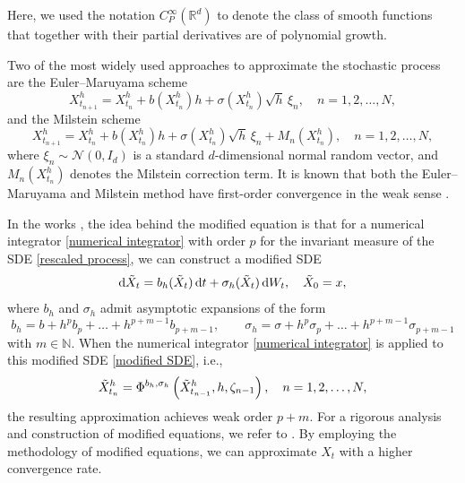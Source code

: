 \documentclass[12pt,a4paper,reqno]{amsart}
\numberwithin{equation}{section}
\begin{document}
Here, we used the notation $C_P^{\infty}(\mathbb{R}^d)$ to denote the class of smooth functions that together with their partial derivatives are of polynomial growth.

Two of the most widely used approaches to approximate the stochastic process are the Euler--Maruyama scheme 
\begin{equation*}
    X_{t_{n+1}}^h = X_{t_{n}}^h +b\left(X_{t_{n}}^h\right)h + \sigma\left(X_{t_{n}}^h\right)\sqrt{h}\,\xi_n, \quad n =1,2,\dotsc,N,
\end{equation*}
and the Milstein scheme 
\begin{equation}\label{Milstein scheme}
    X_{t_{n+1}}^h = X_{t_{n}}^h +b\left(X_{t_{n}}^h\right)h + \sigma\left(X_{t_{n}}^h\right)\sqrt{h}\,\xi_n  + M_n\left(X_{t_n}^h\right), \quad n =1,2,\dotsc,N,
\end{equation}
where $\xi_n\sim \mathcal{N}(0,I_d)$ is a standard $d$-dimensional normal random vector, and $M_n(X_{t_n}^h)$ denotes the Milstein correction term. It is known that both the Euler--Maruyama and Milstein method have first-order convergence in the weak sense \cite{MT21}.

In the works \cite{ACV12,AVZ14,Zyg11}, the idea behind the modified equation is that for a numerical integrator \eqref{numerical integrator} with order $p$ for the invariant measure of the SDE \eqref{rescaled process}, we can construct a modified SDE
\begin{equation}\label{modified SDE}
    \mathrm{d}\Tilde{X}_t = b_h(\Tilde{X}_t)\, \mathrm{d}t + \sigma_h(\Tilde{X}_t) \,\mathrm{d}W_t,\quad \Tilde{X}_0 = x,
\end{equation}
where $b_h$ and $\sigma_h$ admit asymptotic expansions of the form 
\begin{equation}\label{modified coefficients}
    b_h = b + h^pb_p + \dotsc + h^{p +m-1}b_{p+m-1},\qquad \sigma_h = \sigma + h^p\sigma_p + \dotsc + h^{p+m-1}\sigma_{p+m-1}
\end{equation}
with $m\in \mathbb{N}$. When the numerical integrator \eqref{numerical integrator} is applied to this modified SDE \eqref{modified SDE}, i.e.,
\begin{equation*}
    \Tilde{X}^h_{t_n} = \Phi^{b_h,\sigma_h}\left(\Tilde{X}^h_{t_{n-1}},h,\zeta_{n-1}\right),\quad n = 1,2,\dotsc,N,
\end{equation*}
the resulting approximation achieves weak order $p+m$. For a rigorous analysis and construction of modified equations, we refer to \cite{ACV12,AVZ14,Zyg11}. By employing the methodology of modified equations, we can approximate $X_t$ with a higher convergence rate. 
 
\end{document}
